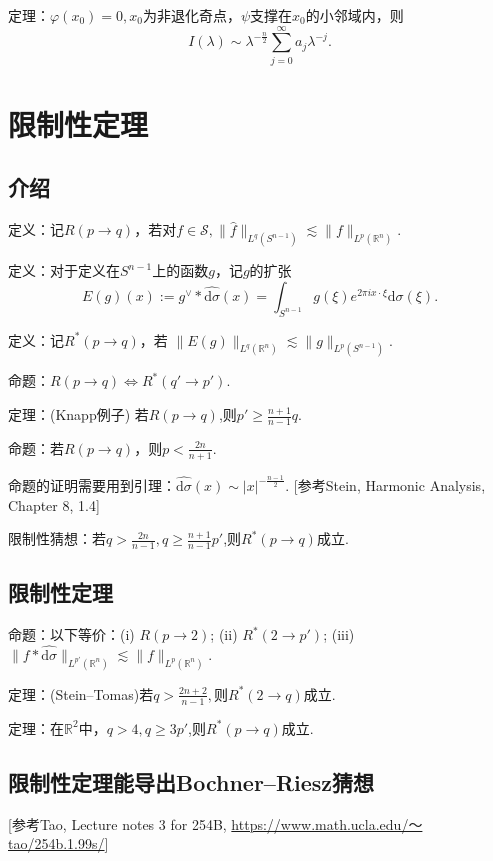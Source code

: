 定理：$\varphi(x_0)=0,x_0$为非退化奇点，$\psi$支撑在$x_0$的小邻域内，则
$$I(\lambda)\sim \lambda^{-\frac{n}{2}}\sum_{j=0}^\infty a_j \lambda^{-j}.$$

\section{限制性定理}

\subsection{介绍}

定义：记$R(p\to q)$，若对$f\in \mathscr{S},
\|\hat{f}\|_{L^q(S^{n-1})}\lesssim \|f\|_{L^p(\mathbb{R}^n)}$.

定义：对于定义在$S^{n-1}$上的函数$g$，记$g$的扩张
$$E(g)(x):=g^\vee*\widehat{\mathrm{d}\sigma}(x)
=\int _{S^{n-1}}g(\xi )e^{2\pi ix\cdot\xi}\mathrm{d}\sigma(\xi).$$

定义：记$R^*(p\to q)$，若
$\|E(g)\|_{L^q(\mathbb{R}^n)}\lesssim \|g\|_{L^p(S^{n-1})}$.

命题：$R(p\to q)\Leftrightarrow R^*(q'\to p')$.

定理：(Knapp例子) 若$R(p\to q)$,则$p'\geq \frac{n+1}{n-1}q$.

命题：若$R(p\to q)$，则$p<\frac{2n}{n+1}.$

命题的证明需要用到引理：$\widehat{\mathrm{d}\sigma}(x)\sim  |x|^{-\frac{n-1}2}$.
[参考Stein, Harmonic Analysis, Chapter 8, 1.4]

限制性猜想：若$q>\frac{2n}{n-1},q\geq \frac{n+1}{n-1}p'$,则$R^*(p\to q)$成立.

\subsection{限制性定理}

命题：以下等价：(i) $R(p\to 2)$;
(ii) $R^*(2\to p')$;
(iii) $\|f*\widehat{\mathrm{d}\sigma}\|_{L^{p'}(\mathbb{R}^n)}
\lesssim \|f\|_{L^p(\mathbb{R}^n)}.$

定理：(Stein--Tomas)若$q>\frac{2n+2}{n-1},$则$R^*(2\to q)$成立.

定理：在$\mathbb{R}^2$中，$q>4,q\geq 3p'$,则$R^*(p\to q)$成立.

\subsection{限制性定理能导出Bochner--Riesz猜想}
[参考Tao, Lecture notes 3 for 254B, \href{https://www.math.ucla.edu/~tao/254b.1.99s/}{https://www.math.ucla.edu/～tao/254b.1.99s/}]

